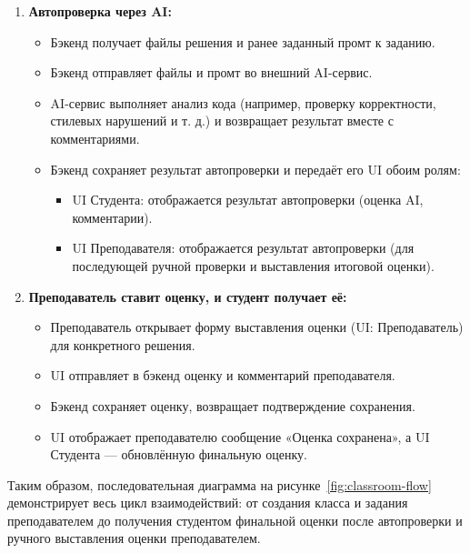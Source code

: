 \begin{enumerate}
    \item \textbf{Автопроверка через AI:}
    \begin{itemize}
        \item Бэкенд получает файлы решения и ранее заданный промт к заданию.
        \item Бэкенд отправляет файлы и промт во внешний AI-сервис.
        \item AI-сервис выполняет анализ кода (например, проверку корректности, стилевых нарушений и т. д.) и возвращает результат вместе с комментариями.
        \item Бэкенд сохраняет результат автопроверки и передаёт его UI обоим ролям:
        \begin{itemize}
            \item UI Студента: отображается результат автопроверки (оценка AI, комментарии).
            \item UI Преподавателя: отображается результат автопроверки (для последующей ручной проверки и выставления итоговой оценки).
        \end{itemize}
    \end{itemize}

    \item \textbf{Преподаватель ставит оценку, и студент получает её:}
    \begin{itemize}
        \item Преподаватель открывает форму выставления оценки (UI: Преподаватель) для конкретного решения.
        \item UI отправляет в бэкенд оценку и комментарий преподавателя.
        \item Бэкенд сохраняет оценку, возвращает подтверждение сохранения.
        \item UI отображает преподавателю сообщение «Оценка сохранена», а UI Студента — обновлённую финальную оценку.
    \end{itemize}
\end{enumerate}

Таким образом, последовательная диаграмма на рисунке~\ref{fig:classroom-flow} демонстрирует весь цикл взаимодействий: от создания класса и задания преподавателем до получения студентом финальной оценки после автопроверки и ручного выставления оценки преподавателем.
